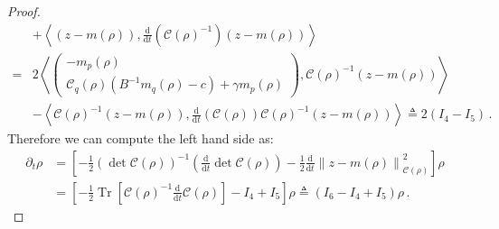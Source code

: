 \documentclass[12pt]{caltech_thesis}
\numberwithin{equation}{section}
\begin{document}
{\begin{proof}
\[\begin{aligned}
&+\left\langle(z-m(\rho)), \frac{\mathrm{d}}{\mathrm{d} t}\left({\mathcal{C}}(\rho)^{-1}\right)(z-m(\rho))\right\rangle \\
=&2\left\langle \begin{pmatrix}
-m_p(\rho) \\
\mathcal{C}_q(\rho)(B^{-1}m_q(\rho)-c) + {\gamma}m_p(\rho)
\end{pmatrix}, \mathcal{C}(\rho)^{-1}(z-m(\rho))\right\rangle\\&-\left\langle{\mathcal{C}}(\rho)^{-1}(z-m(\rho)), \frac{\mathrm{d}}{\mathrm{d} t}\left({\mathcal{C}}(\rho)\right){\mathcal{C}}(\rho)^{-1}(z-m(\rho))\right\rangle\triangleq 2(I_4-I_5)\,.
\end{aligned}\]
Therefore we can compute the left hand side as:\[\begin{aligned}
\partial_{t} \rho &=\left[-\frac{1}{2}(\operatorname{det} {\mathcal{C}}(\rho))^{-1}\left(\frac{\mathrm{d}}{\mathrm{d} t} \operatorname{det} {\mathcal{C}}(\rho)\right)-\frac{1}{2} \frac{\mathrm{d}}{\mathrm{d} t}\left\|z-m(\rho)\right\|_{{\mathcal{C}}(\rho)}^{2}\right] \rho \\
&=\left[-\frac{1}{2}\operatorname{Tr}\left[{\mathcal{C}}(\rho)^{-1} \frac{\mathrm{d}}{\mathrm{d} t} {\mathcal{C}}(\rho)\right]-I_4+I_5\right] \rho\triangleq (I_6-I_4+I_5)\rho\,.
\end{aligned}\]


\end{proof}}
\end{document}
